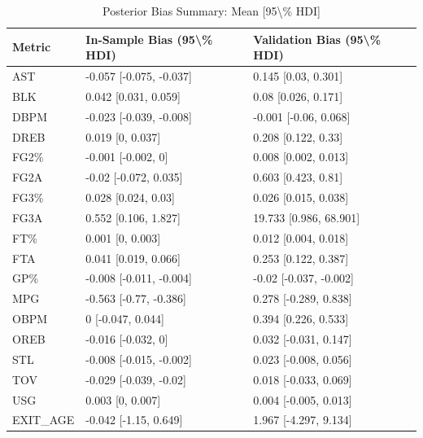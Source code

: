 \begin{table}[t]
\caption*{
{\fontsize{20}{25}\selectfont  Posterior Bias Summary: Mean [95\textbackslash{}\% HDI]\fontsize{12}{15}\selectfont }
} 
\fontsize{12.0pt}{14.0pt}\selectfont
\begin{tabular*}{\linewidth}{@{\extracolsep{\fill}}lll}
\toprule
Metric & In-Sample Bias (95\textbackslash{}\% HDI) & Validation Bias (95\textbackslash{}\% HDI) \\ 
\midrule\addlinespace[2.5pt]
AST & -0.057 [-0.075, -0.037] & 0.145 [0.03, 0.301] \\ 
BLK & 0.042 [0.031, 0.059] & 0.08 [0.026, 0.171] \\ 
DBPM & -0.023 [-0.039, -0.008] & -0.001 [-0.06, 0.068] \\ 
DREB & 0.019 [0, 0.037] & 0.208 [0.122, 0.33] \\ 
FG2\% & -0.001 [-0.002, 0] & 0.008 [0.002, 0.013] \\ 
FG2A & -0.02 [-0.072, 0.035] & 0.603 [0.423, 0.81] \\ 
FG3\% & 0.028 [0.024, 0.03] & 0.026 [0.015, 0.038] \\ 
FG3A & 0.552 [0.106, 1.827] & 19.733 [0.986, 68.901] \\ 
FT\% & 0.001 [0, 0.003] & 0.012 [0.004, 0.018] \\ 
FTA & 0.041 [0.019, 0.066] & 0.253 [0.122, 0.387] \\ 
GP\% & -0.008 [-0.011, -0.004] & -0.02 [-0.037, -0.002] \\ 
MPG & -0.563 [-0.77, -0.386] & 0.278 [-0.289, 0.838] \\ 
OBPM & 0 [-0.047, 0.044] & 0.394 [0.226, 0.533] \\ 
OREB & -0.016 [-0.032, 0] & 0.032 [-0.031, 0.147] \\ 
STL & -0.008 [-0.015, -0.002] & 0.023 [-0.008, 0.056] \\ 
TOV & -0.029 [-0.039, -0.02] & 0.018 [-0.033, 0.069] \\ 
USG & 0.003 [0, 0.007] & 0.004 [-0.005, 0.013] \\ 
EXIT\_AGE & -0.042 [-1.15, 0.649] & 1.967 [-4.297, 9.134] \\ 
\bottomrule
\end{tabular*}
\end{table}

